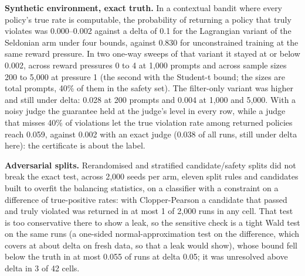 \documentclass[11pt]{article}
\begin{document}
\textbf{Synthetic environment, exact truth.} In a contextual bandit where every policy's true rate is computable, the probability of returning a policy that truly violates was 0.000--0.002 against a delta of 0.1 for the Lagrangian variant of the Seldonian arm under four bounds, against 0.830 for unconstrained training at the same reward pressure. In two one-way sweeps of that variant it stayed at or below 0.002, across reward pressures 0 to 4 at 1,000 prompts and across sample sizes 200 to 5,000 at pressure 1 (the second with the Student-t bound; the sizes are total prompts, 40\% of them in the safety set). The filter-only variant was higher and still under delta: 0.028 at 200 prompts and 0.004 at 1,000 and 5,000. With a noisy judge the guarantee held at the judge's level in every row, while a judge that misses 40\% of violations let the true violation rate among returned policies reach 0.059, against 0.002 with an exact judge (0.038 of all runs, still under delta here): the certificate is about the label.


\textbf{Adversarial splits.} Rerandomised and stratified candidate/safety splits did not break the exact test, across 2,000 seeds per arm, eleven split rules and candidates built to overfit the balancing statistics, on a classifier with a constraint on a difference of true-positive rates: with Clopper-Pearson a candidate that passed and truly violated was returned in at most 1 of 2,000 runs in any cell. That test is too conservative there to show a leak, so the sensitive check is a tight Wald test on the same runs (a one-sided normal-approximation test on the difference, which covers at about delta on fresh data, so that a leak would show), whose bound fell below the truth in at most 0.055 of runs at delta 0.05; it was unresolved above delta in 3 of 42 cells.
\end{document}
